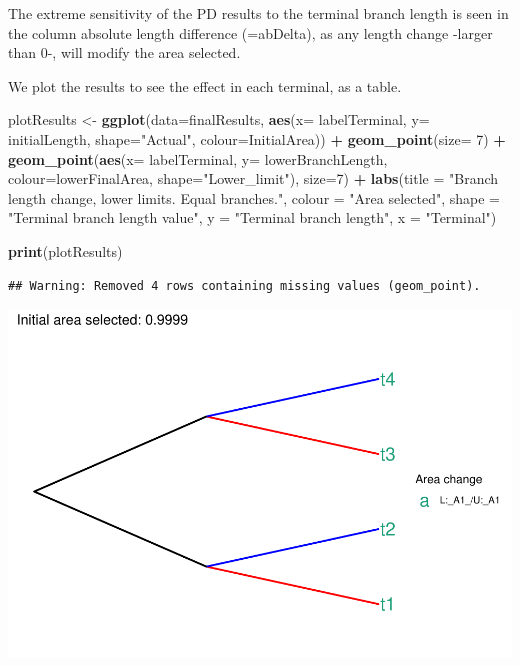 \documentclass[]{article}
\newenvironment{Shaded}{\begin{snugshade}}{\end{snugshade}}
\newcommand{\DataTypeTok}[1]{\textcolor[rgb]{0.13,0.29,0.53}{#1}}
\newcommand{\DecValTok}[1]{\textcolor[rgb]{0.00,0.00,0.81}{#1}}
\newcommand{\KeywordTok}[1]{\textcolor[rgb]{0.13,0.29,0.53}{\textbf{#1}}}
\newcommand{\NormalTok}[1]{#1}
\newcommand{\OperatorTok}[1]{\textcolor[rgb]{0.81,0.36,0.00}{\textbf{#1}}}
\newcommand{\StringTok}[1]{\textcolor[rgb]{0.31,0.60,0.02}{#1}}
\begin{document}
The extreme sensitivity of the PD results to the terminal branch length
is seen in the column absolute length difference (=abDelta), as any
length change -larger than 0-, will modify the area selected.

We plot the results to see the effect in each terminal, as a table.

\begin{Shaded}
\begin{Highlighting}[]
\NormalTok{plotResults <-}\StringTok{ }\KeywordTok{ggplot}\NormalTok{(}\DataTypeTok{data=}\NormalTok{finalResults, }\KeywordTok{aes}\NormalTok{(}\DataTypeTok{x=}\NormalTok{ labelTerminal, }\DataTypeTok{y=}\NormalTok{ initialLength,}
                      \DataTypeTok{shape=}\StringTok{"Actual"}\NormalTok{,}
                      \DataTypeTok{colour=}\NormalTok{InitialArea)) }\OperatorTok{+}
\StringTok{               }\KeywordTok{geom_point}\NormalTok{(}\DataTypeTok{size=} \DecValTok{7}\NormalTok{) }\OperatorTok{+}
\StringTok{               }\KeywordTok{geom_point}\NormalTok{(}\KeywordTok{aes}\NormalTok{(}\DataTypeTok{x=}\NormalTok{ labelTerminal, }\DataTypeTok{y=}\NormalTok{ lowerBranchLength,}
                              \DataTypeTok{colour=}\NormalTok{lowerFinalArea,}
                              \DataTypeTok{shape=}\StringTok{"Lower_limit"}\NormalTok{), }\DataTypeTok{size=}\DecValTok{7}\NormalTok{) }\OperatorTok{+}
\StringTok{               }\KeywordTok{labs}\NormalTok{(}\DataTypeTok{title =} \StringTok{"Branch length change, lower limits. Equal branches."}\NormalTok{,}
                    \DataTypeTok{colour =} \StringTok{"Area selected"}\NormalTok{,}
                    \DataTypeTok{shape =} \StringTok{"Terminal branch length value"}\NormalTok{,}
                    \DataTypeTok{y =} \StringTok{"Terminal branch length"}\NormalTok{,}
                    \DataTypeTok{x =} \StringTok{"Terminal"}\NormalTok{)}

\KeywordTok{print}\NormalTok{(plotResults)}
\end{Highlighting}
\end{Shaded}

\begin{verbatim}
## Warning: Removed 4 rows containing missing values (geom_point).
\end{verbatim}

\includegraphics{workedExample_files/figure-latex/unnamed-chunk-9-1.pdf}
\end{document}
